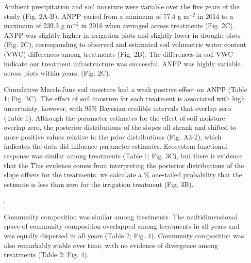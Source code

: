 \documentclass[fleqn,10pt,lineno]{wlpeerj} %
\begin{document}
Ambient precipitation and soil moisture were variable over the five
years of the study (Fig. 2A-B). ANPP varied from a minimum of 77.4 g
m\(^{-2}\) in 2014 to a maximum of 239.3 g m\(^{-2}\) in 2016 when
averaged across treatments (Fig. 2C). ANPP was slightly higher in
irrigation plots  and slightly lower in
drought plots 
(Fig. 2C), corresponding to observed and estimated soil volumetric water
content (VWC) differences among treatments (Fig. 2B).
The differences in soil VWC indicate our treatment infrastructure was
successful. ANPP was highly variable across plots within years,
(Fig. 2C).

Cumulative March-June soil moisture had a weak positive effect on ANPP
(Table 1; Fig. 3C). The effect of soil moisture for each treatment is
associated with high uncertainty, however, with 95\% Bayesian credible
intervals that  overlap zero (Table 1). Although the
parameter estimates for the effect of soil moisture overlap zero, the
posterior distributions of the slopes all shrank and shifted to more
positive values relative to the prior distributions (Fig. A3-2), which
indicates the data did influence parameter estimates. Ecosystem
functional response was similar among treatments (Table 1; Fig. 3C), but
there is evidence that the
This evidence comes from interpreting the posterior distributions of the
slope offsets for the treatments.  we
calculate a \% one-tailed probability that the estimate is less
than zero for the irrigation treatment
(Fig. 3B).

.

Community composition was similar among treatments. The multidimensional
space of community composition overlapped among treatments in all years
and was equally dispersed in all years (Table 2; Fig. 4). Community
composition was also remarkably stable over time, with no evidence of
divergence among treatments (Table 2; Fig. 4).
\end{document}
